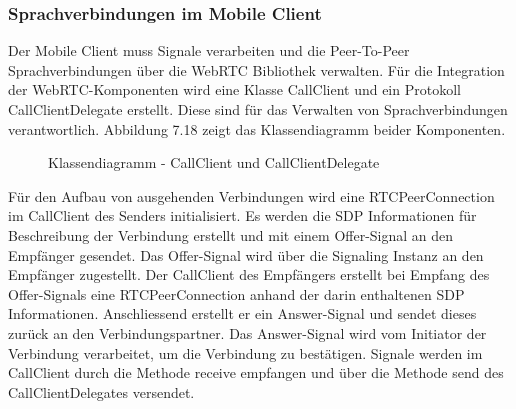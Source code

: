 \subsubsection{Sprachverbindungen im Mobile Client}

Der Mobile Client muss Signale verarbeiten und die Peer-To-Peer Sprachverbindungen über die WebRTC Bibliothek verwalten.
Für die Integration der WebRTC-Komponenten wird eine Klasse CallClient und ein Protokoll CallClientDelegate erstellt.
Diese sind für das Verwalten von Sprachverbindungen verantwortlich.
Abbildung 7.18 zeigt das Klassendiagramm beider Komponenten.

\begin{figure}[h]
    \centering
    \begin{minipage}[b]{0.6\textwidth}
        \caption{Klassendiagramm - CallClient und CallClientDelegate}
    \end{minipage}
\end{figure}

Für den Aufbau von ausgehenden Verbindungen wird eine RTCPeerConnection im CallClient des Senders initialisiert.
Es werden die SDP Informationen für Beschreibung der Verbindung erstellt und mit einem Offer-Signal an den Empfänger gesendet.
Das Offer-Signal wird über die Signaling Instanz an den Empfänger zugestellt.
Der CallClient des Empfängers erstellt bei Empfang des Offer-Signals eine RTCPeerConnection anhand der darin enthaltenen SDP Informationen.
Anschliessend erstellt er ein Answer-Signal und sendet dieses zurück an den Verbindungspartner.
Das Answer-Signal wird vom Initiator der Verbindung verarbeitet, um die Verbindung zu bestätigen.
Signale werden im CallClient durch die Methode receive empfangen und über die Methode send des CallClientDelegates versendet.

